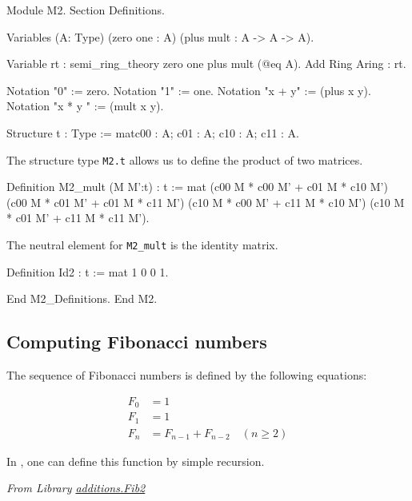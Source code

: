 \begin{Coqsrc}
Module M2.
Section Definitions.
  
  Variables (A: Type) (zero one : A)  (plus mult  : A -> A -> A).
  
  Variable rt : semi_ring_theory  zero one plus mult   (@eq A).
  Add Ring Aring : rt.

  Notation "0" := zero.  
  Notation "1" := one.
  Notation "x + y" := (plus x y).  
  Notation "x * y " := (mult x y).
  
  Structure t : Type := mat{c00 : A;  c01 : A;  c10 : A;  c11 : A}.
\end{Coqsrc}


The structure type \texttt{M2.t} allows us to define the product
of two matrices. 


\begin{Coqsrc}
Definition M2_mult (M M':t) : t := mat
  (c00 M * c00 M' + c01 M * c10 M') (c00 M * c01 M' + c01 M * c11 M')
  (c10 M * c00 M' + c11 M * c10 M') (c10 M * c01 M' + c11 M * c11 M').
\end{Coqsrc}

The neutral element for \texttt{M2\_mult} is the identity matrix.

\begin{Coqsrc}
Definition Id2 : t := mat 1 0 0 1.

End M2_Definitions.
End M2.
\end{Coqsrc}

\subsection{Computing Fibonacci numbers}

The sequence of Fibonacci numbers is defined by the following equations:

\begin{align}
F_0 & = 1 \\
F_1 & = 1 \\
F_n & = F_{n-1} + F_{n-2} \quad (n \geq 2)
\end{align}


In \coq{}, one can define this function by simple recursion.

\emph{From Library
\href{../theories/html/additions.Fib2.html}{additions.Fib2}}


